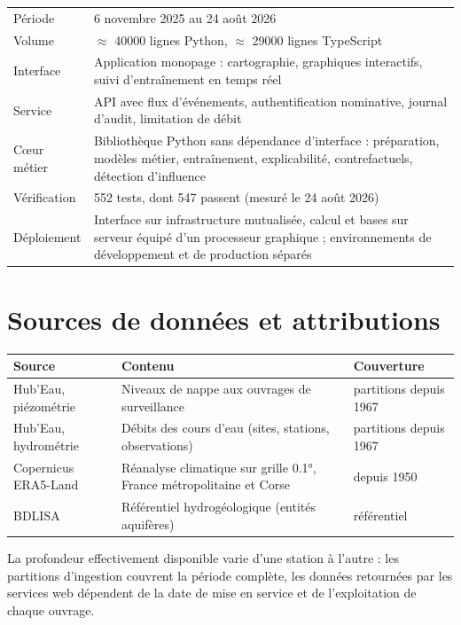 \begin{center}
\begin{tabularx}{\textwidth}{@{}lX@{}}
\toprule
Période & 6 novembre 2025 au 24 août 2026 \\
Volume & $\approx$ \num{40000} lignes Python, $\approx$ \num{29000} lignes TypeScript \\
Interface & Application monopage : cartographie, graphiques interactifs, suivi d'entraînement
en temps réel \\
Service & API avec flux d'événements, authentification nominative, journal d'audit, limitation
de débit \\
Cœur métier & Bibliothèque Python sans dépendance d'interface : préparation, modèles métier,
entraînement, explicabilité, contrefactuels, détection d'influence \\
Vérification & \num{552} tests, dont \num{547} passent (mesuré le 24 août 2026) \\
Déploiement & Interface sur infrastructure mutualisée, calcul et bases sur serveur équipé d'un
processeur graphique ; environnements de développement et de production séparés \\
\bottomrule
\end{tabularx}
\end{center}

\section{Sources de données et attributions}

\begin{center}
\begin{tabularx}{\textwidth}{@{}lXl@{}}
\toprule
\textbf{Source} & \textbf{Contenu} & \textbf{Couverture} \\
\midrule
Hub'Eau, piézométrie & Niveaux de nappe aux ouvrages de surveillance & partitions depuis 1967 \\
Hub'Eau, hydrométrie & Débits des cours d'eau (sites, stations, observations) & partitions
depuis 1967 \\
Copernicus ERA5-Land & Réanalyse climatique sur grille \ang{0.1}, France métropolitaine et
Corse & depuis 1950 \\
BDLISA & Référentiel hydrogéologique (entités aquifères) & référentiel \\
\bottomrule
\end{tabularx}
\end{center}

\noindent
La profondeur effectivement disponible varie d'une station à l'autre : les partitions
d'ingestion couvrent la période complète, les données retournées par les services web dépendent
de la date de mise en service et de l'exploitation de chaque ouvrage.

